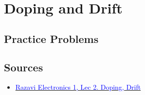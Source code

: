 \section{Doping and Drift}

\subsection{Practice Problems}

\subsection{Sources}
\begin{itemize}
    \item \href{https://www.youtube.com/watch?v=NWolpDgi6_Y}{\textcolor{blue}{Razavi Electronics 1, Lec 2. Doping, Drift}}
\end{itemize}